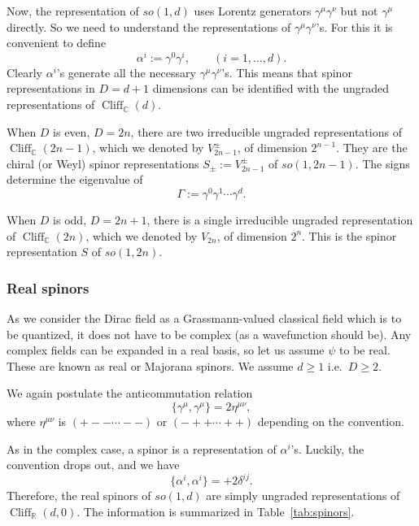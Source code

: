 \documentclass[12pt]{article}
\numberwithin{equation}{section}
\numberwithin{figure}{section}
\theoremstyle{remark}
\def\bC{\mathbb{C}}
\def\bR{\mathbb{R}}
\def\Cliff{\mathop{\mathrm{Cliff}}\nolimits}
\begin{document}
Now, the representation of $so(1,d)$ uses Lorentz generators $\gamma^\mu\gamma^\nu$
but not $\gamma^\mu$ directly. 
So we need to understand the representations of $\gamma^\mu\gamma^\nu$'s.
For this it is convenient to define \begin{equation}
\alpha^i :=\gamma^0\gamma^i,\qquad (i=1,\ldots, d).
\end{equation} 
Clearly $\alpha^i$'s generate all the necessary $\gamma^\mu\gamma^\nu$'s.
This means that spinor representations in $D=d+1$ dimensions
can be identified with the ungraded representations of $\Cliff_\bC(d)$.

When $D$ is even, $D=2n$,
there are two irreducible ungraded representations of $\Cliff_\bC(2n-1)$,
which we denoted by $V_{2n-1}^\pm$, of dimension $2^{n-1}$.
They are the chiral (or Weyl) spinor representations $S_\pm :=V_{2n-1}^\pm$ of $so(1,2n-1)$.
The signs determine the eigenvalue of \begin{equation}
\Gamma:= \gamma^0 \gamma^1\cdots \gamma^d. 
\end{equation}

When $D$ is odd, $D=2n+1$, 
there is a single irreducible ungraded representation of $\Cliff_\bC(2n)$,
which we denoted by $V_{2n}$, of dimension $2^n$.
This is the spinor representation $S$ of $so(1,2n)$.

\subsubsection{Real spinors}

As we consider the Dirac field as a Grassmann-valued classical field which is to be quantized,
it does not have to be complex (as a wavefunction should be).
Any complex fields can be expanded in a real basis, so let us assume $\psi$ to be real.
These are known as real or Majorana spinors.
We  assume $d\ge 1$ i.e.~$D\ge 2$.


We again postulate the anticommutation relation \begin{equation}
\{\gamma^\mu ,\gamma^\mu\} = 2\eta^{\mu\nu},
\end{equation} where $\eta^{\mu\nu}$ is $(+--\cdots--)$ or $(-++\cdots++)$ 
depending on the convention.

As in the complex case, a spinor is a representation of $\alpha^i$'s.
Luckily, the convention drops out, and we have \begin{equation}
\{\alpha^i, \alpha^i\} = +2\delta^{ij}.\label{alphas}
\end{equation}
Therefore, the real spinors of $so(1,d)$ are simply ungraded representations of $\Cliff_\bR(d,0)$.
The information is summarized in Table~\ref{tab:spinors}.
\end{document}
